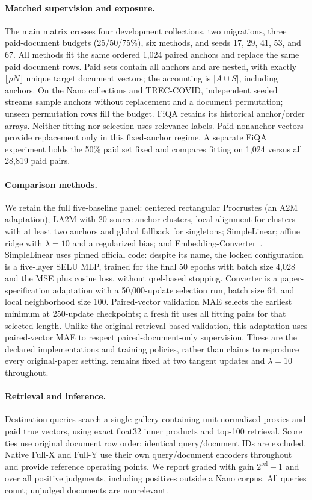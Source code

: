 \paragraph{Matched supervision and exposure.}
The main matrix crosses four development collections, two migrations,
three paid-document budgets (25/50/75\%), six methods, and seeds
17, 29, 41, 53, and 67. All methods fit the same ordered 1,024 paired anchors
and replace the same paid document rows. Paid sets contain all anchors and
are nested, with exactly $\lfloor \rho N\rfloor$ unique target document vectors;
the accounting is $|A\cup S|$, including anchors. On the Nano collections and
TREC-COVID, independent seeded streams sample anchors without replacement
and a document permutation; unseen permutation rows fill the budget. FiQA
retains its historical anchor/order arrays. Neither fitting nor selection uses
relevance labels. Paid nonanchor vectors provide replacement only in this
fixed-anchor regime. A separate FiQA experiment holds the 50\% paid set
fixed and compares fitting on 1,024 versus all 28,819 paid pairs.

\paragraph{Comparison methods.}
We retain the full five-baseline panel: centered rectangular Procrustes
(an A2M adaptation); LA2M with 20 source-anchor clusters, local alignment
for clusters with at least two anchors and global fallback for singletons;
SimpleLinear; affine ridge with $\lambda=10$
and a regularized bias; and Embedding-Converter~\cite{la2m,simplelinear,embeddingconverter}.
SimpleLinear uses pinned official code: despite its name, the locked
configuration is a five-layer SELU MLP, trained for the final 50 epochs with
batch size 4,028 and the MSE plus cosine loss, without qrel-based stopping.
Converter is a paper-specification adaptation with a 50,000-update
selection run, batch size 64, and local neighborhood size 100. Paired-vector
validation MAE selects the earliest minimum at 250-update checkpoints;
a fresh fit uses all fitting pairs for that selected length. Unlike the
original retrieval-based validation, this adaptation uses paired-vector MAE
to respect paired-document-only supervision. These are the
declared implementations and training policies, rather than claims to
reproduce every original-paper setting. \method{} remains fixed at two
tangent updates and $\lambda=10$ throughout.

\paragraph{Retrieval and inference.}
Destination queries search a single gallery containing unit-normalized
proxies and paid true vectors, using exact float32 inner products and
top-100 retrieval. Score ties use original document row order; identical
query/document IDs are excluded. Native Full-X and Full-Y use their own
query/document encoders throughout and provide reference operating points.
We report graded \ndcg{} with gain $2^{\mathrm{rel}}-1$ and \recall{} over all
positive judgments, including positives outside a Nano corpus. All queries
count; unjudged documents are nonrelevant.

